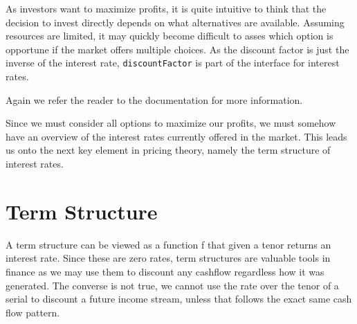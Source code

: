 As investors want to maximize profits, it is quite intuitive to think that
the decision to invest directly depends on what alternatives are available.
Assuming resources are limited, it may quickly become difficult to asses which
option is opportune if the market offers multiple choices. As the discount factor
is just the inverse of the interest rate, \texttt{discountFactor} is part of the
interface for interest rates. 

Again we refer the reader to the \hql documentation\cite{hqldoc} for more information.

Since we must consider all options to maximize our profits, we must somehow have an
overview of the interest rates currently offered in the market. This leads us onto the
next key element in pricing theory, namely the term structure of interest rates.

\section{Term Structure}

A term structure can be viewed as a function f that given a tenor returns 
an interest rate. Since these are zero rates, term structures are valuable 
tools in finance as we may use them to discount any cashflow regardless how it
was generated. The converse is not true, we cannot use the rate over the tenor
of a serial to discount a future income stream, unless that follows the exact
same cash flow pattern.\\


